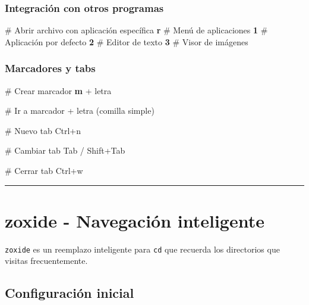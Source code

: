 \documentclass[
  11pt,
  letterpaper,
  oneside,
  openany]{scrbook}
\newenvironment{Shaded}{}{}
\newcommand{\CommentTok}[1]{\textcolor[rgb]{0.42,0.45,0.49}{#1}}
\newcommand{\ExtensionTok}[1]{\textcolor[rgb]{0.84,0.23,0.29}{\textbf{#1}}}
\newcommand{\NormalTok}[1]{\textcolor[rgb]{0.14,0.16,0.18}{#1}}
\newcommand{\StringTok}[1]{\textcolor[rgb]{0.01,0.18,0.38}{#1}}
\begin{document}
\subsubsection{Integración con otros
programas}\label{integraciuxf3n-con-otros-programas}

\begin{Shaded}
\begin{Highlighting}[]
\CommentTok{\# Abrir archivo con aplicación específica}
\ExtensionTok{r}    \CommentTok{\# Menú de aplicaciones}
\ExtensionTok{1}    \CommentTok{\# Aplicación por defecto}
\ExtensionTok{2}    \CommentTok{\# Editor de texto}
\ExtensionTok{3}    \CommentTok{\# Visor de imágenes}
\end{Highlighting}
\end{Shaded}

\subsubsection{Marcadores y tabs}\label{marcadores-y-tabs}

\begin{Shaded}
\begin{Highlighting}[]
\CommentTok{\# Crear marcador}
\ExtensionTok{m}\NormalTok{ + letra}

\CommentTok{\# Ir a marcador}
\StringTok{\textquotesingle{} + letra  (comilla simple)}

\StringTok{\# Nuevo tab}
\StringTok{Ctrl+n}

\StringTok{\# Cambiar tab}
\StringTok{Tab / Shift+Tab}

\StringTok{\# Cerrar tab}
\StringTok{Ctrl+w}
\end{Highlighting}
\end{Shaded}

\begin{center}\rule{0.5\linewidth}{0.5pt}\end{center}

\section{zoxide - Navegación inteligente}\label{sec-zoxide}

\texttt{zoxide} es un reemplazo inteligente para \texttt{cd} que
recuerda los directorios que visitas frecuentemente.

\subsection{Configuración inicial}\label{configuraciuxf3n-inicial}
\end{document}

